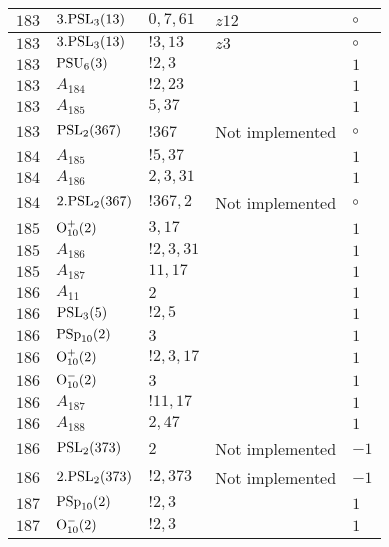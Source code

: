\documentclass[a4paper, 11pt]{article}
\begin{document}
\begin{longtable}{lllll}
        $ 183 $ & $ 3.{\rm PSL}_{3}(13) $ & $ 0, 7, 61 $ & $ z12 $ &  $\circ$ \\ \hline
        $ 183 $ & $ 3.{\rm PSL}_{3}(13) $ & $ ! 3,13 $ & $ z3 $ &  $\circ$ \\ \hline
        $ 183 $ & $ {\rm PSU}_{6}(3) $ & $ ! 2,3 $ & $ ~ $ & $ 1$ \\ \hline
        $ 183 $ & $ A_{184} $ & $ !2, 23 $ & $ ~ $ & $ 1$ \\ \hline
        $ 183 $ & $ A_{185} $ & $ 5, 37 $ & $ ~ $ & $ 1$ \\ \hline
        $ 183 $ & $ {\rm PSL}_{2}(367) $ & $ !367 $ &  Not implemented &  $\circ$ \\ \hline
        $ 184 $ & $ A_{185} $ & $ !5, 37 $ & $ ~ $ & $ 1$ \\ \hline
        $ 184 $ & $ A_{186} $ & $ 2, 3, 31 $ & $ ~ $ & $ 1$ \\ \hline
        $ 184 $ & $ 2.{\rm PSL}_{2}(367) $ & $ !367, 2 $ &  Not implemented &  $\circ$ \\ \hline
        $ 185 $ & $ {\rm O}_{10}^+(2) $ & $ 3, 17 $ & $ ~ $ & $ 1$ \\ \hline
        $ 185 $ & $ A_{186} $ & $ !2, 3, 31 $ & $ ~ $ & $ 1$ \\ \hline
        $ 185 $ & $ A_{187} $ & $ 11, 17 $ & $ ~ $ & $ 1$ \\ \hline
        $ 186 $ & $ A_{11} $ & $ 2 $ & $ ~ $ & $ 1$ \\ \hline
        $ 186 $ & $ {\rm PSL}_{3}(5) $ & $ ! 2,5 $ & $ ~ $ & $ 1$ \\ \hline
        $ 186 $ & $ {\rm PSp}_{10}(2) $ & $ 3 $ & $ ~ $ & $ 1$ \\ \hline
        $ 186 $ & $ {\rm O}_{10}^+(2) $ & $ ! 2,3,17 $ & $ ~ $ & $ 1$ \\ \hline
        $ 186 $ & $ {\rm O}_{10}^-(2) $ & $ 3 $ & $ ~ $ & $ 1$ \\ \hline
        $ 186 $ & $ A_{187} $ & $ !11, 17 $ & $ ~ $ & $ 1$ \\ \hline
        $ 186 $ & $ A_{188} $ & $ 2, 47 $ & $ ~ $ & $ 1$ \\ \hline
        $ 186 $ & $ {\rm PSL}_{2}(373) $ & $ 2 $ &  Not implemented & $ -1$ \\ \hline
        $ 186 $ & $ 2.{\rm PSL}_{2}(373) $ & $ !2, 373 $ &  Not implemented & $ -1$ \\ \hline
        $ 187 $ & $ {\rm PSp}_{10}(2) $ & $ ! 2,3 $ & $ ~ $ & $ 1$ \\ \hline
        $ 187 $ & $ {\rm O}_{10}^-(2) $ & $ ! 2,3 $ & $ ~ $ & $ 1$ \\ \hline

\end{longtable}
\end{document}
